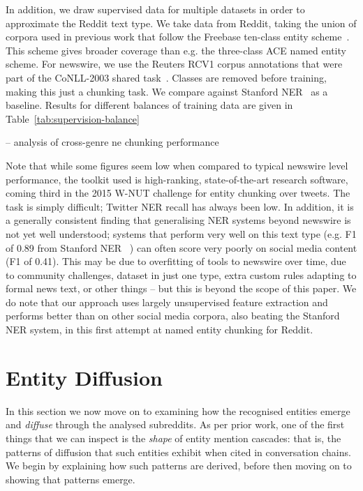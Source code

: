 \documentclass[journal,10pt,draftclsnofoot,onecolumn]{IEEEtran}
\begin{document}
In addition, we draw supervised data for multiple datasets in order to approximate the Reddit text type.
We take data from Reddit, taking the union of corpora used in previous work that follow the Freebase ten-class entity scheme~\cite{ritter2011named,baldwin2015shared}.
This scheme gives broader coverage than e.g. the three-class ACE named entity scheme.
For newswire, we use the Reuters RCV1 corpus annotations that were part of the CoNLL-2003 shared task~\cite{tjong2003introduction}.
Classes are removed before training, making this just a chunking task.
We compare against Stanford NER~\cite{finkel2005incorporating} as a baseline.
Results for different balances of training data are given in Table~\ref{tab:supervision-balance}


-- analysis of cross-genre ne chunking performance


Note that while some figures seem low when compared to typical newswire level performance, the toolkit used is high-ranking, state-of-the-art research software, coming third in the 2015 W-NUT challenge for entity chunking over tweets.
The task is simply difficult; Twitter NER recall has always been low.
In addition, it is a generally consistent finding that generalising NER systems beyond newswire is not yet well understood; systems that perform very well on this text type (e.g. F1 of 0.89 from Stanford NER~\cite{derczynski2015analysis}%
) can often score very poorly on social media content (F1 of 0.41).
This may be due to overfitting of tools to newswire over time, due to community challenges, dataset in just one type, extra custom rules adapting to formal news text, or other things -- but this is beyond the scope of this paper.
We do note that our approach uses largely unsupervised feature extraction and performs better than on other social media corpora, also beating the Stanford NER system, in this first attempt at named entity chunking for Reddit.


\clearpage
\section{Entity Diffusion}
In this section we now move on to examining how the recognised entities emerge and \emph{diffuse} through the analysed subreddits.
As per prior work, one of the first things that we can inspect is the \emph{shape} of entity mention cascades: that is, the patterns of diffusion that such entities exhibit when cited in conversation chains. 
We begin by explaining how such patterns are derived, before then moving on to showing that patterns emerge.
\end{document}
